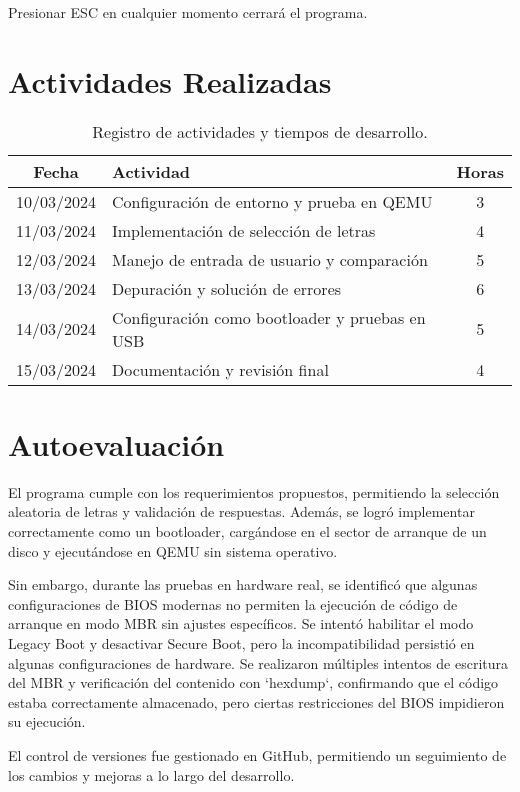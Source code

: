 \documentclass[conference]{IEEEtran}
\begin{document}
Presionar ESC en cualquier momento cerrará el programa.

\section{Actividades Realizadas}
\begin{table}[htbp]
    \centering
    \begin{tabular}{|c|l|c|}
        \hline
        \textbf{Fecha} & \textbf{Actividad} & \textbf{Horas} \\
        \hline
        10/03/2024 & Configuración de entorno y prueba en QEMU & 3 \\
        11/03/2024 & Implementación de selección de letras & 4 \\
        12/03/2024 & Manejo de entrada de usuario y comparación & 5 \\
        13/03/2024 & Depuración y solución de errores & 6 \\
        14/03/2024 & Configuración como bootloader y pruebas en USB & 5 \\
        15/03/2024 & Documentación y revisión final & 4 \\
        \hline
    \end{tabular}
    \caption{Registro de actividades y tiempos de desarrollo.}
\end{table}

\section{Autoevaluación}
El programa cumple con los requerimientos propuestos, permitiendo la selección aleatoria de letras y validación de respuestas. Además, se logró implementar correctamente como un bootloader, cargándose en el sector de arranque de un disco y ejecutándose en QEMU sin sistema operativo. 

Sin embargo, durante las pruebas en hardware real, se identificó que algunas configuraciones de BIOS modernas no permiten la ejecución de código de arranque en modo MBR sin ajustes específicos. Se intentó habilitar el modo Legacy Boot y desactivar Secure Boot, pero la incompatibilidad persistió en algunas configuraciones de hardware. Se realizaron múltiples intentos de escritura del MBR y verificación del contenido con `hexdump`, confirmando que el código estaba correctamente almacenado, pero ciertas restricciones del BIOS impidieron su ejecución.

El control de versiones fue gestionado en GitHub, permitiendo un seguimiento de los cambios y mejoras a lo largo del desarrollo.
\end{document}
